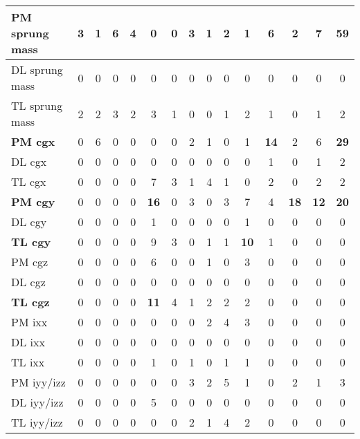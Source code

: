 \begin{table}[H]
\begin{tabular}{|l|c|c|c|c|c|c|c|c|c|c|c|c|c|c|}
    \hline
    \textcolor[rgb]{0.000, 0.447, 0.698}{\textbf{PM sprung mass}} & 3 & 1 & 6 & 4 & 0 & 0 & 3 & 1 & 2 & 1 & 6 & 2 & 7 & \textcolor[rgb]{0.000, 0.447, 0.698}{\textbf{59}} \\
    \hline
    DL sprung mass & 0 & 0 & 0 & 0 & 0 & 0 & 0 & 0 & 0 & 0 & 0 & 0 & 0 & 0 \\
    \hline
    TL sprung mass & 2 & 2 & 3 & 2 & 3 & 1 & 0 & 0 & 1 & 2 & 1 & 0 & 1 & 2 \\
    \hline
    \textcolor[rgb]{0.000, 0.620, 0.451}{\textbf{PM \gls{cgx}}} & 0 & 6 & 0 & 0 & 0 & 0 & 2 & 1 & 0 & 1 & \textbf{14} & 2 & 6 & \textcolor[rgb]{0.000, 0.620, 0.451}{\textbf{29}} \\
    \hline
    DL \gls{cgx} & 0 & 0 & 0 & 0 & 0 & 0 & 0 & 0 & 0 & 0 & 1 & 0 & 1 & 2 \\
    \hline
    TL \gls{cgx} & 0 & 0 & 0 & 0 & 7 & 3 & 1 & 4 & 1 & 0 & 2 & 0 & 2 & 2 \\
    \hline
    \textbf{PM \gls{cgy}} & 0 & 0 & 0 & 0 & \textbf{16} & 0 & 3 & 0 & 3 & 7 & 4 & \textbf{18} & \textbf{12} & \textbf{20} \\
    \hline
    DL \gls{cgy} & 0 & 0 & 0 & 0 & 1 & 0 & 0 & 0 & 0 & 1 & 0 & 0 & 0 & 0 \\
    \hline
    \textbf{TL \gls{cgy}} & 0 & 0 & 0 & 0 & 9 & 3 & 0 & 1 & 1 & \textbf{10} & 1 & 0 & 0 & 0 \\
    \hline
    PM \gls{cgz} & 0 & 0 & 0 & 0 & 6 & 0 & 0 & 1 & 0 & 3 & 0 & 0 & 0 & 0 \\
    \hline
    DL \gls{cgz} & 0 & 0 & 0 & 0 & 0 & 0 & 0 & 0 & 0 & 0 & 0 & 0 & 0 & 0 \\
    \hline
    \textbf{TL \gls{cgz}} & 0 & 0 & 0 & 0 & \textbf{11} & 4 & 1 & 2 & 2 & 2 & 0 & 0 & 0 & 0 \\
    \hline
    PM \gls{ixx} & 0 & 0 & 0 & 0 & 0 & 0 & 0 & 2 & 4 & 3 & 0 & 0 & 0 & 0 \\
    \hline
    DL \gls{ixx} & 0 & 0 & 0 & 0 & 0 & 0 & 0 & 0 & 0 & 0 & 0 & 0 & 0 & 0 \\
    \hline
    TL \gls{ixx} & 0 & 0 & 0 & 0 & 1 & 0 & 1 & 0 & 1 & 1 & 0 & 0 & 0 & 0 \\
    \hline
    PM \gls{iyy}/\gls{izz} & 0 & 0 & 0 & 0 & 0 & 0 & 3 & 2 & 5 & 1 & 0 & 2 & 1 & 3 \\
    \hline
    DL \gls{iyy}/\gls{izz} & 0 & 0 & 0 & 0 & 5 & 0 & 0 & 0 & 0 & 0 & 0 & 0 & 0 & 0 \\
    \hline
    TL \gls{iyy}/\gls{izz} & 0 & 0 & 0 & 0 & 0 & 0 & 2 & 1 & 4 & 2 & 0 & 0 & 0 & 0 \\

\end{tabular}
\end{table}
